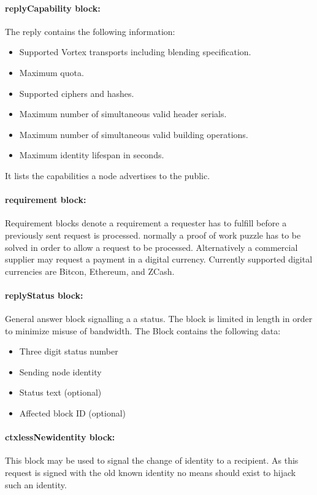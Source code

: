 \paragraph{replyCapability block:}
The reply contains the following information:
\begin{itemize}
	\item Supported Vortex transports including blending specification.
	\item Maximum quota.
	\item Supported ciphers and hashes.
	\item Maximum number of simultaneous valid header serials.
	\item Maximum number of simultaneous valid building operations.
	\item Maximum identity lifespan in seconds.
\end{itemize}
It lists the capabilities a node advertises to the public. 

\paragraph{requirement block:}
Requirement blocks denote a requirement a requester has to fulfill before a previously sent request is processed. normally a proof of work puzzle has to be solved in order to allow a request to be processed. Alternatively a commercial supplier may request a payment in a digital currency. Currently supported digital currencies are Bitcon, Ethereum, and ZCash.

\paragraph{replyStatus block:}
General answer block signalling a a status. The block is limited in length in order to minimize misuse of bandwidth. The Block contains the following data:
\begin{itemize}
	\item Three digit status number
	\item Sending node identity
	\item Status text (optional)
	\item Affected block ID (optional)
\end{itemize}

\paragraph{ctxlessNewidentity block:}
This block may be used to signal the change of identity to a recipient. As this request is signed with the old known identity no means should exist to hijack such an identity.

